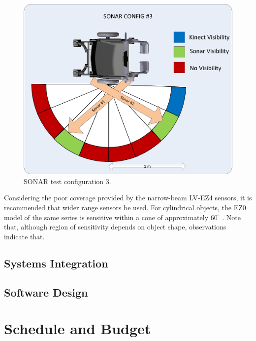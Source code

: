 \documentclass[oneside,final]{report}
\begin{document}
\begin{figure}[hbt]
 \centering
 \includegraphics[scale=0.6]{SONAR_Config3.png}
 \caption{SONAR test configuration 3.}
 \label{sonar_3}
\end{figure}

\clearpage
Considering the poor coverage provided by the narrow-beam LV-EZ4 sensors, it is recommended that wider range sensors be used.  For cylindrical objects, the EZ0 model of the same series is sensitive within a cone of approximately $60^\circ$ \cite{lv-ez0}.  Note that, although region of sensitivity depends on object shape, observations indicate that.

\section{Systems Integration}

\section{Software Design}

\chapter{Schedule and Budget}
\end{document}

